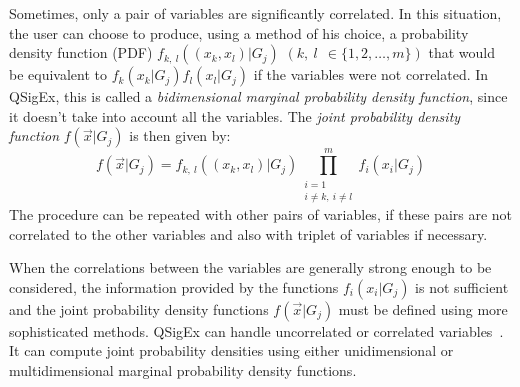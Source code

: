 Sometimes, only a pair of variables are significantly correlated. In this
situation, the user can choose to produce, using a method of his choice, a
probability density function (PDF) $f_{k,\ l}\left((x_k,x_l)|G_j\right)$ $\left(k,\ l\ \ \in
\{1,2,\ldots,m\}\right)$ that would be equivalent to $f_k(x_k|G_j)f_l(x_l|G_j)$
if the variables were not correlated. In QSigEx, this is called a {\em
bidimensional marginal probability density function}, since it doesn't take into
account all the variables. The {\em joint probability density function}
$f(\vec{x}|G_j)$ is then given by:
\begin{equation} \label{i:jpdfvsmpdf2}
f(\vec{x}|G_j)=f_{k,\ l}\left((x_k,x_l)|G_j\right)\prod_{\substack{
i=1\\
i\ne k,\ i\ne l
}}^{m} f_i(x_i|G_j)
\end{equation}
The procedure can be repeated with other pairs of variables, if these pairs are
not correlated to the other variables and also with triplet of variables if
necessary.
 
When the correlations between the variables are generally strong enough to be
considered, the information provided by the functions $f_i(x_i|G_j)$ is not
sufficient and the joint probability density functions $f(\vec{x}|G_j)$ must be
defined using more sophisticated methods. QSigEx can handle uncorrelated or
correlated variables~\cite{Karlen:1998}. It can compute joint probability densities
using either unidimensional or multidimensional marginal probability density functions.

